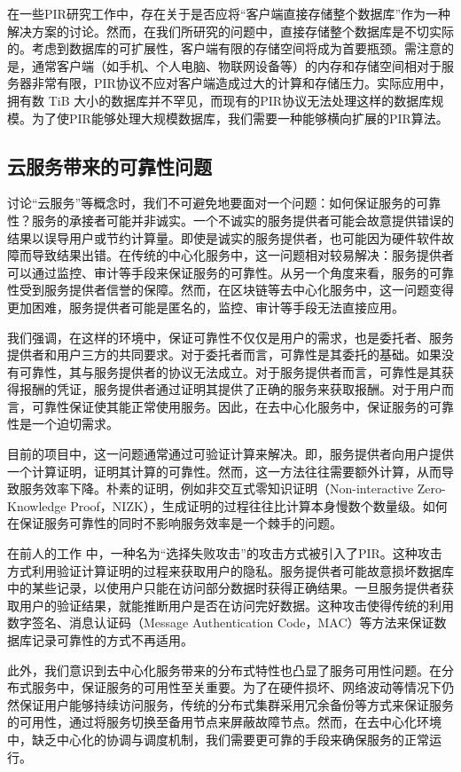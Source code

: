 在一些PIR研究工作中，存在关于是否应将“客户端直接存储整个数据库”作为一种解决方案的讨论。然而，在我们所研究的问题中，直接存储整个数据库是不切实际的。考虑到数据库的可扩展性，客户端有限的存储空间将成为首要瓶颈。需注意的是，通常客户端（如手机、个人电脑、物联网设备等）的内存和存储空间相对于服务器非常有限，PIR协议不应对客户端造成过大的计算和存储压力。实际应用中，拥有数 TiB 大小的数据库并不罕见，而现有的PIR协议无法处理这样的数据库规模。为了使PIR能够处理大规模数据库，我们需要一种能够横向扩展的PIR算法。

\subsection{云服务带来的可靠性问题}
讨论“云服务”等概念时，我们不可避免地要面对一个问题：如何保证服务的可靠性？服务的承接者可能并非诚实。一个不诚实的服务提供者可能会故意提供错误的结果以误导用户或节约计算量。即使是诚实的服务提供者，也可能因为硬件软件故障而导致结果出错。在传统的中心化服务中，这一问题相对较易解决：服务提供者可以通过监控、审计等手段来保证服务的可靠性。从另一个角度来看，服务的可靠性受到服务提供者信誉的保障。然而，在区块链等去中心化服务中，这一问题变得更加困难，服务提供者可能是匿名的，监控、审计等手段无法直接应用。

我们强调，在这样的环境中，保证可靠性不仅仅是用户的需求，也是委托者、服务提供者和用户三方的共同要求。对于委托者而言，可靠性是其委托的基础。如果没有可靠性，其与服务提供者的协议无法成立。对于服务提供者而言，可靠性是其获得报酬的凭证，服务提供者通过证明其提供了正确的服务来获取报酬。对于用户而言，可靠性保证使其能正常使用服务。因此，在去中心化服务中，保证服务的可靠性是一个迫切需求。

目前的项目中，这一问题通常通过可验证计算来解决。即，服务提供者向用户提供一个计算证明，证明其计算的可靠性。然而，这一方法往往需要额外计算，从而导致服务效率下降。朴素的证明，例如非交互式零知识证明\cite{10.1007/3-540-46766-1_35}（Non-interactive Zero-Knowledge Proof，NIZK），生成证明的过程往往比计算本身慢数个数量级。如何在保证服务可靠性的同时不影响服务效率是一个棘手的问题。

在前人的工作 \cite{APIR} 中，一种名为“选择失败攻击”的攻击方式被引入了PIR。这种攻击方式利用验证计算证明的过程来获取用户的隐私。服务提供者可能故意损坏数据库中的某些记录，以使用户只能在访问部分数据时获得正确结果。一旦服务提供者获取用户的验证结果，就能推断用户是否在访问完好数据。这种攻击使得传统的利用数字签名、消息认证码（Message Authentication Code，MAC）等方法来保证数据库记录可靠性的方式不再适用。

此外，我们意识到去中心化服务带来的分布式特性也凸显了服务可用性问题。在分布式服务中，保证服务的可用性至关重要。为了在硬件损坏、网络波动等情况下仍然保证用户能够持续访问服务，传统的分布式集群采用冗余备份等方式来保证服务的可用性，通过将服务切换至备用节点来屏蔽故障节点。然而，在去中心化环境中，缺乏中心化的协调与调度机制，我们需要更可靠的手段来确保服务的正常运行。